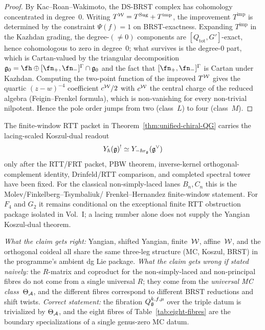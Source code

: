 \begin{proof}
By Kac--Roan--Wakimoto, the DS-BRST complex has cohomology
concentrated in degree~$0$. Writing $T^{\mathcal{W}} = T^{\mathrm{Sug}}
+ T^{\mathrm{imp}}$, the improvement $T^{\mathrm{imp}}$ is
determined by the constraint $\Psi(f)=1$ on BRST-exactness. Expanding
$T^{\mathrm{imp}}$ in the Kazhdan grading, the degree-$(\ne 0)$
components are $[Q_{\mathrm{tot}},G']$-exact, hence cohomologous to
zero in degree~$0$; what survives is the degree-$0$ part, which is
Cartan-valued by the triangular decomposition
$\fg_0 = \fh\oplus[\fn_+,\fn_-]^\Gamma\cap\fg_0$ and the fact that
$[\fn_+,\fn_-]^\Gamma$ is Cartan under Kazhdan. Computing the
two-point function of the improved $T^{\mathcal{W}}$ gives the quartic
$(z-w)^{-4}$ coefficient $c^{\mathcal{W}}/2$ with $c^{\mathcal{W}}$ the central charge
of the reduced algebra (Feigin--Frenkel formula), which is
non-vanishing for every non-trivial nilpotent. Hence the pole order
jumps from two (class~$L$) to four (class~$M$).
\end{proof}

\begin{remark}
\label{rem:qlanglands-non-simply-laced}
The finite-window RTT packet in Theorem~\ref{thm:unified-chiral-QG}
carries the lacing-scaled Koszul-dual readout
\[
        Y_\hbar(\mathfrak{g})^! \simeq Y_{-\hbar r_{\mathfrak{g}}}(\mathfrak{g}^\vee)
\]
only after the RTT/FRT packet, PBW theorem, inverse-kernel
orthogonal-complement identity, Drinfeld/RTT comparison, and completed
spectral tower have been fixed. For the classical non-simply-laced
lanes $B_n,C_n$ this is the Molev/Finkelberg--Tsymbaliuk/
Frenkel--Hernandez finite-window statement. For $F_4$ and $G_2$ it
remains conditional on the exceptional finite RTT obstruction package
isolated in Vol.~I; a lacing number alone does not supply the Yangian
Koszul-dual theorem.
\end{remark}

\begin{remark}
\label{rem:first-principles-triple-unified}
\emph{What the claim gets right:} Yangian, shifted Yangian, finite~$\mathcal{W}$,
affine~$\mathcal{W}$, and the orthogonal coideal all share the same three-leg
structure (MC, Koszul, BRST) in the programme's ambient dg Lie package.
\emph{What the claim gets wrong if stated naively:} the $R$-matrix and
coproduct for the non-simply-laced and non-principal fibres do not
come from a single universal $R$; they come from the \emph{universal MC
class}~$\Theta_{\mathcal{A}}$, and the different fibres correspond to different
BRST reductions and shift twists. \emph{Correct statement:} the
fibration $Q_{\mathfrak{g}}^{k,f,\mu}$ over the triple datum is trivialized by
$\Theta_{\mathcal{A}}$, and the eight fibres of Table~\ref{tab:eight-fibres} are
the boundary specializations of a single genus-zero MC datum.
\end{remark}


